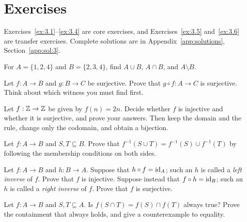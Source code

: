 \section*{Exercises}
Exercises~\ref{ex:3.1}--\ref{ex:3.4} are core exercises, and Exercises~\ref{ex:3.5} and~\ref{ex:3.6} are transfer exercises. Complete solutions are in Appendix~\ref{app:solutions}, Section~\ref{app:sol:3}.
\begin{exercise}\label{ex:3.1}For $A=\{1,2,4\}$ and $B=\{2,3,4\}$, find $A\cup B$, $A\cap B$, and $A\setminus B$.\end{exercise}
\begin{exercise}\label{ex:3.2}Let $f:A\to B$ and $g:B\to C$ be surjective. Prove that $g\circ f:A\to C$ is surjective. Think about which witness you must find first.\end{exercise}
\begin{exercise}\label{ex:3.3}Let $f:\mathbb Z\to\mathbb Z$ be given by $f(n)=2n$. Decide whether $f$ is injective and whether it is surjective, and prove your answers. Then keep the domain and the rule, change only the codomain, and obtain a bijection.\end{exercise}
\begin{exercise}\label{ex:3.4}Let $f:A\to B$ and $S,T\subseteq B$. Prove that $f^{-1}(S\cup T)=f^{-1}(S)\cup f^{-1}(T)$ by following the membership conditions on both sides.\end{exercise}
\begin{exercise}\label{ex:3.5}Let $f:A\to B$ and $h:B\to A$. Suppose that $h\circ f=\operatorname{id}_A$; such an $h$ is called a \emph{left inverse} of $f$. Prove that $f$ is injective. Suppose instead that $f\circ h=\operatorname{id}_B$; such an $h$ is called a \emph{right inverse} of $f$. Prove that $f$ is surjective.\end{exercise}
\begin{exercise}\label{ex:3.6}Let $f:A\to B$ and $S,T\subseteq A$. Is $f(S\cap T)=f(S)\cap f(T)$ always true? Prove the containment that always holds, and give a counterexample to equality.\end{exercise}
